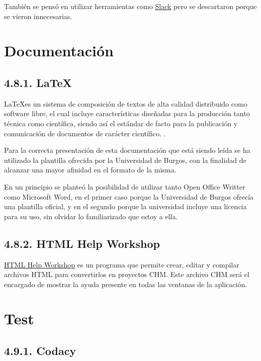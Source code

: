 También se pensó en utilizar herramientas como \href{https://slack.com/intl/es-es/}{Slack} pero se descartaron porque se vieron innecesarias.

\section{Documentación}

\subsection{4.8.1. LaTeX}

\LaTeX es un sistema de composición de textos de alta calidad distribuido como software libre, el cual incluye características diseñadas para la producción tanto técnica como científica, siendo así el estándar de facto para la publicación y comunicación de documentos de carácter científico. \cite{web:latex}.

Para la correcta presentación de esta documentación que está siendo leída se ha utilizado la plantilla ofrecida por la Universidad de Burgos, con la finalidad de alcanzar una mayor afinidad en el formato de la misma.

En un principio se planteó la posibilidad de utilizar tanto Open Office Writter como Microsoft Word, en el primer caso porque la Universidad de Burgos ofrecía una plantilla oficial, y en el segundo porque la universidad incluye una licencia para su uso, sin olvidar lo familiarizado que estoy a ella.

\subsection{4.8.2. HTML Help Workshop}

\href{https://www.microsoft.com/en-us/download/details.aspx?id=21138}{HTML Help Workshop} es un programa que permite crear, editar y compilar archivos HTML para convertirlos en proyectos CHM. Este archivo CHM será el encargado de mostrar la ayuda presente en todas las ventanas de la aplicación.


\section{Test}

\subsection{4.9.1. Codacy}


